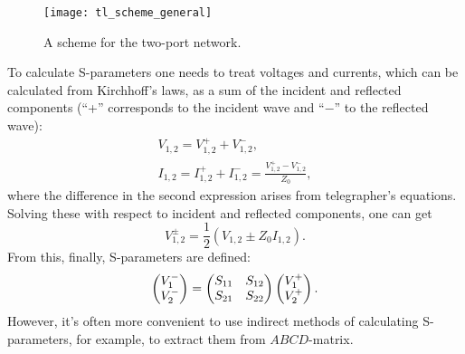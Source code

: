 \begin{figure}[h]
\centering
\texttt{[image: tl\_scheme\_general]}
\caption{A scheme for the two-port network.}
\label{fgeneral2port}
\end{figure}

To calculate S-parameters one needs to treat voltages and currents, which can be calculated from Kirchhoff's laws, as a sum of the incident and reflected components (``+'' corresponds to the incident wave and ``$-$'' to the reflected wave):
\begin{gather*}
V_{1,2} = V_{1,2}^+ + V_{1,2}^- ,\\
I_{1,2} = I_{1,2}^+ + I_{1,2}^- = \frac{ V_{1,2}^+ - V_{1,2}^- }{Z_0},
\end{gather*}
where the difference in the second expression arises from telegrapher's equations. Solving these with respect to incident and reflected components, one can get
\begin{equation*}
V_{1,2}^\pm = \frac{1}{2}(V_{1,2} \pm Z_0 I_{1,2}).
\end{equation*}
From this, finally, S-parameters are defined:
\begin{equation}
\left( \begin{matrix}
V_1^- \\
V_2^-
\end{matrix} \right) = 
\left( \begin{matrix}
S_{11} & S_{12} \\
S_{21} & S_{22}
\end{matrix} \right)
\left( \begin{matrix}
V_1^+ \\
V_2^+
\end{matrix} \right).
\label{eq:S_def}
\end{equation}
However, it's often more convenient to use indirect methods of calculating S-parameters, for example, to extract them from $ABCD$-matrix.




